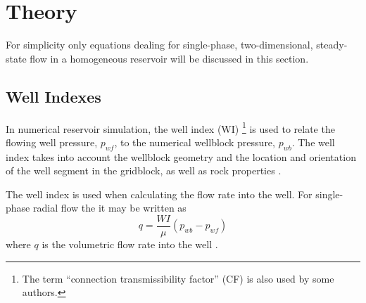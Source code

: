 
\section{Theory} %
\label{sec:theory}
For simplicity only equations dealing for single-phase, two-dimensional, steady-state flow in a homogeneous reservoir will be discussed in this section.

\subsection{Well Indexes} %
\label{sub:well_indices}
In numerical reservoir simulation, the well index (WI) \footnote{The term ``connection transmissibility factor'' (CF) is also used by some authors\citet{Peaceman2003New,Schlumberger2013Eclipse}.} is used to relate the flowing well pressure, $p_{wf}$,  to the numerical wellblock pressure, $p_{wb}$. The well index takes into account the wellblock geometry and the location and orientation of the well segment in the gridblock, as well as rock properties \citet{Peaceman2003New}.

The well index is used when calculating the flow rate into the well. For single-phase radial flow the it may be written as
\begin{equation}
    \label{eq:peaceman-wi1}
    q = \frac{WI}{\mu} \left( p_{wb} - p_{wf} \right)
\end{equation}
where $q$ is the volumetric flow rate into the well \citet{Peaceman2003New}.

